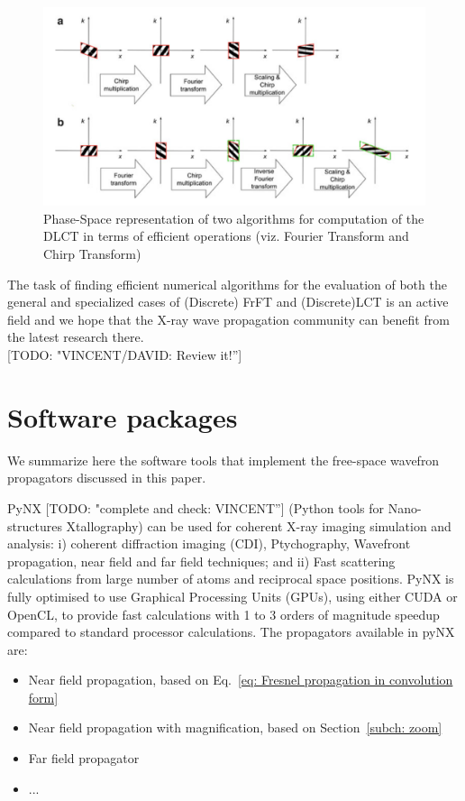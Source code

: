 \documentclass{iucr}              %
\newcommand{\todo}[1]{{\color{red}[TODO: "#1'']}}
\newcommand{\inred}[1]{{\color{red}#1}}
\begin{document}
\begin{figure}
\label{fig: DLCT_graphic}
\caption{Phase-Space representation of two algorithms for computation of the DLCT in terms of efficient operations (viz. Fourier Transform and Chirp Transform)\cite{Healy2016}} 
\includegraphics[width=1\textwidth]{DLCT_implementation.png}
\end{figure}
The task of finding efficient numerical algorithms for the evaluation of both the general and specialized cases of (Discrete) FrFT and (Discrete)LCT is an active field \cite{BULTHEEL2004182,Koç2016} and we hope that the X-ray wave propagation community can benefit from the latest research there. \\
\todo{VINCENT/DAVID: Review it!}


\section{Software packages}
\label{ch: packages}

We summarize here the software tools that implement the free-space wavefron propagators discussed in this paper. 

PyNX \todo{complete and check: VINCENT} \cite{Favre-Nicolin:hx5119} (Python tools for Nano-structures Xtallography) can be used for coherent X-ray imaging simulation and analysis: i) coherent diffraction imaging (CDI), Ptychography, Wavefront propagation, near field and far field techniques; and ii) Fast scattering calculations from large number of atoms and reciprocal space positions. PyNX is fully optimised to use Graphical Processing Units (GPUs), using either CUDA or OpenCL, to provide fast calculations with 1 to 3 orders of magnitude speedup compared to standard processor calculations. The propagators available in pyNX are: 
\begin{itemize}
    \item Near field propagation, based on Eq.~\ref{eq: Fresnel propagation in convolution form}
    \item Near field propagation with magnification, based on Section~\ref{subch: zoom}
    \item Far field propagator
    \item \inred{...}
\end{itemize}
\end{document}
